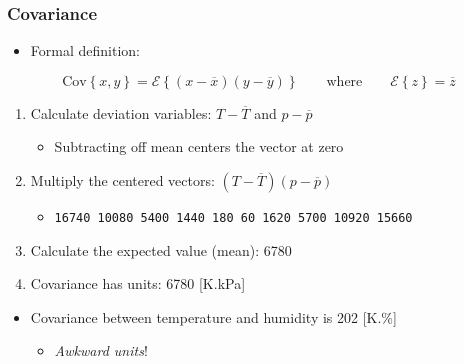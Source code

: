 \begin{frame}\frametitle{Covariance}
	\begin{itemize}
		\item	Formal definition: 
	\end{itemize}
	$$ \text{Cov}\left\{x, y\right\} = \mathcal{E}\left\{ (x - \overline{x}) (y - \overline{y})\right\} \qquad \text{where} \qquad \mathcal{E}\left\{ z \right\} = \overline{z} $$
	
	\begin{enumerate}
		\item	Calculate deviation variables: $T - \overline{T}$ and $p - \overline{p}$ 
		\begin{itemize}
			\item	Subtracting off mean centers the vector at zero 
		\end{itemize}
		\item	Multiply the centered vectors: $(T - \overline{T}) (p - \overline{p})$ 
		\begin{itemize}
			\item	\texttt{16740 10080 5400 1440 180 60 1620 5700 10920 15660} 
		\end{itemize}
		\item	Calculate the expected value (mean): 6780 
		\item	Covariance has units: 6780 [K.kPa] 
	\end{enumerate}
	
	\vspace{12pt}
	\begin{itemize}
		\item	Covariance between temperature and humidity is 202 [K.\%] 
		\begin{itemize}
			\item	\emph{Awkward units}!
		\end{itemize}
	\end{itemize}
\end{frame}

